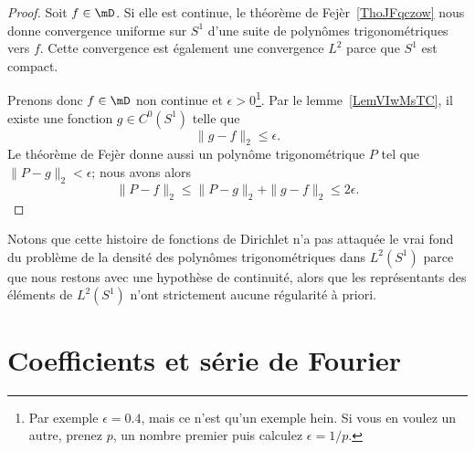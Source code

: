 \begin{proof}
    Soit \( f\in\mD\). Si elle est continue, le théorème de Fejèr~\ref{ThoJFqczow} nous donne convergence uniforme sur \( S^1\) d'une suite de polynômes trigonométriques vers \( f\). Cette convergence est également une convergence \( L^2\) parce que \( S^1\) est compact.

    Prenons donc \( f\in \mD\) non continue et \( \epsilon>0\)\footnote{Par exemple \( \epsilon=0.4\), mais ce n'est qu'un exemple hein. Si vous en voulez un autre, prenez \( p\), un nombre premier puis calculez \( \epsilon=1/p\).}. Par le lemme~\ref{LemVIwMsTC}, il existe une fonction \( g\in C^0(S^1)\) telle que
    \begin{equation}
        \| g-f \|_2\leq \epsilon.
    \end{equation}
    Le théorème de Fejèr donne aussi un polynôme trigonométrique \( P\) tel que \( \| P-g \|_2<\epsilon\); nous avons alors
    \begin{equation}
        \| P-f \|_2\leq \| P-g \|_{2}+\| g-f \|_2\leq 2\epsilon.
    \end{equation}
\end{proof}

Notons que cette histoire de fonctions de Dirichlet n'a pas attaquée le vrai fond du problème de la densité des polynômes trigonométriques dans \(  L^2(S^1)\) parce que nous restons avec une hypothèse de continuité, alors que les représentants des éléments de \( L^2(S^1)\) n'ont strictement aucune régularité à priori.

\section{Coefficients et série de Fourier}

